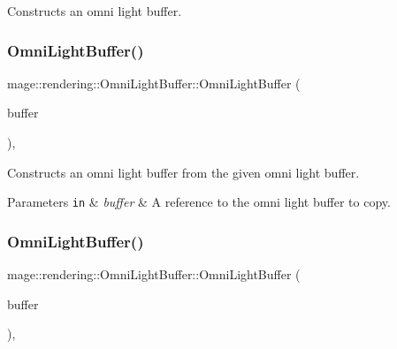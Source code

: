 Constructs an omni light buffer. \mbox{\label{structmage_1_1rendering_1_1_omni_light_buffer_a716417506a93d27a0093b408e88f92e4}} 
\subsubsection{\texorpdfstring{Omni\+Light\+Buffer()}{OmniLightBuffer()}\hspace{0.1cm}{\footnotesize\ttfamily [2/3]}}
{\footnotesize\ttfamily mage\+::rendering\+::\+Omni\+Light\+Buffer\+::\+Omni\+Light\+Buffer (\begin{DoxyParamCaption}\item[{const \mbox{\hyperlink{structmage_1_1rendering_1_1_omni_light_buffer}{Omni\+Light\+Buffer}} \&}]{buffer }\end{DoxyParamCaption})\hspace{0.3cm}{\ttfamily [default]}, {\ttfamily [noexcept]}}

Constructs an omni light buffer from the given omni light buffer.


\begin{DoxyParams}[1]{Parameters}
\mbox{\tt in}  & {\em buffer} & A reference to the omni light buffer to copy. \\
\hline
\end{DoxyParams}
\mbox{\label{structmage_1_1rendering_1_1_omni_light_buffer_a8a1a458735f88d1dbd86590f1807c0a4}} 
\subsubsection{\texorpdfstring{Omni\+Light\+Buffer()}{OmniLightBuffer()}\hspace{0.1cm}{\footnotesize\ttfamily [3/3]}}
{\footnotesize\ttfamily mage\+::rendering\+::\+Omni\+Light\+Buffer\+::\+Omni\+Light\+Buffer (\begin{DoxyParamCaption}\item[{\mbox{\hyperlink{structmage_1_1rendering_1_1_omni_light_buffer}{Omni\+Light\+Buffer}} \&\&}]{buffer }\end{DoxyParamCaption})\hspace{0.3cm}{\ttfamily [default]}, {\ttfamily [noexcept]}}

